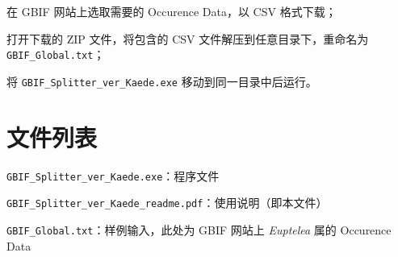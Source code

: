 \documentclass[a4paper, utf-8]{ctexart}
\begin{document}
\begin{enumerate*}
	\item 在 GBIF 网站上选取需要的 Occurence Data，以 CSV 格式下载；
	\item 打开下载的 ZIP 文件，将包含的 CSV 文件解压到任意目录下，重命名为 \verb|GBIF_Global.txt|；
	\item 将 \verb|GBIF_Splitter_ver_Kaede.exe| 移动到同一目录中后运行。
\end{enumerate*}

\section{文件列表}

\begin{itemize*}
	\item \verb|GBIF_Splitter_ver_Kaede.exe|：程序文件
	\item \verb|GBIF_Splitter_ver_Kaede_readme.pdf|：使用说明（即本文件）
	\item \verb|GBIF_Global.txt|：样例输入，此处为 GBIF 网站上 \textit{Euptelea} 属的 Occurence Data
\end{itemize*}
\end{document}
